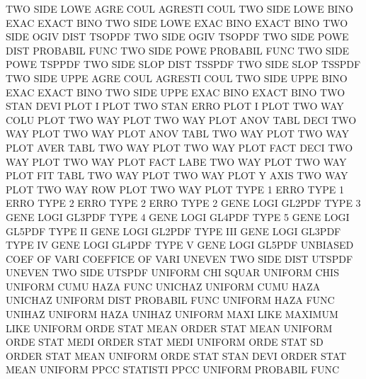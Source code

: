 TWO      SIDE LOWE AGRE COUL            AGRESTI  COUL
TWO      SIDE LOWE BINO EXAC            EXACT    BINO
TWO      SIDE LOWE EXAC BINO            EXACT    BINO
TWO      SIDE OGIV DIST                 TSOPDF
TWO      SIDE OGIV                      TSOPDF
TWO      SIDE POWE DIST                 PROBABIL FUNC
TWO      SIDE POWE                      PROBABIL FUNC
TWO      SIDE POWE                      TSPPDF
TWO      SIDE SLOP DIST                 TSSPDF
TWO      SIDE SLOP                      TSSPDF
TWO      SIDE UPPE AGRE COUL            AGRESTI  COUL
TWO      SIDE UPPE BINO EXAC            EXACT    BINO
TWO      SIDE UPPE EXAC BINO            EXACT    BINO
TWO      STAN DEVI PLOT                 I        PLOT
TWO      STAN ERRO PLOT                 I        PLOT
TWO      WAY  COLU PLOT                 TWO      WAY  PLOT
TWO      WAY  PLOT ANOV TABL DECI       TWO      WAY  PLOT
TWO      WAY  PLOT ANOV TABL            TWO      WAY  PLOT
TWO      WAY  PLOT AVER TABL            TWO      WAY  PLOT
TWO      WAY  PLOT FACT DECI            TWO      WAY  PLOT
TWO      WAY  PLOT FACT LABE            TWO      WAY  PLOT
TWO      WAY  PLOT FIT  TABL            TWO      WAY  PLOT
TWO      WAY  PLOT Y    AXIS            TWO      WAY  PLOT
TWO      WAY  ROW  PLOT                 TWO      WAY  PLOT
TYPE     1    ERRO                      TYPE     1    ERRO
TYPE     2    ERRO                      TYPE     2    ERRO
TYPE     2    GENE LOGI                 GL2PDF
TYPE     3    GENE LOGI                 GL3PDF
TYPE     4    GENE LOGI                 GL4PDF
TYPE     5    GENE LOGI                 GL5PDF
TYPE     II   GENE LOGI                 GL2PDF
TYPE     III  GENE LOGI                 GL3PDF
TYPE     IV   GENE LOGI                 GL4PDF
TYPE     V    GENE LOGI                 GL5PDF
UNBIASED COEF OF   VARI                 COEFFICE OF   VARI
UNEVEN   TWO  SIDE DIST                 UTSPDF
UNEVEN   TWO  SIDE                      UTSPDF
UNIFORM  CHI  SQUAR                     UNIFORM  CHIS
UNIFORM  CUMU HAZA FUNC                 UNICHAZ
UNIFORM  CUMU HAZA                      UNICHAZ
UNIFORM  DIST                           PROBABIL FUNC
UNIFORM  HAZA FUNC                      UNIHAZ
UNIFORM  HAZA                           UNIHAZ
UNIFORM  MAXI LIKE                      MAXIMUM  LIKE
UNIFORM  ORDE STAT MEAN                 ORDER    STAT MEAN
UNIFORM  ORDE STAT MEDI                 ORDER    STAT MEDI
UNIFORM  ORDE STAT SD                   ORDER    STAT MEAN
UNIFORM  ORDE STAT STAN DEVI            ORDER    STAT MEAN
UNIFORM  PPCC                           STATISTI PPCC
UNIFORM                                 PROBABIL FUNC
